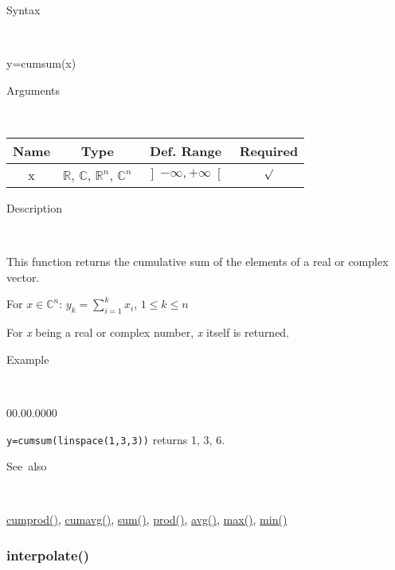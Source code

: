 \begin{description}
\item [Syntax]~
\end{description}
y=cumsum(x)

\begin{description}
\item [Arguments]~
\end{description}
\begin{tabular}{|c|c|c|c|}
\hline 
Name&
Type&
Def. Range&
Required\tabularnewline
\hline
\hline 
x&
$\mathbb{R}$, $\mathbb{C}$, $\mathbb{R}^{n}$, $\mathbb{C}^{n}$&
$\left]-\infty,+\infty\right[$&
$\surd$\tabularnewline
\hline
\end{tabular}

\begin{description}
\item [Description]~
\end{description}
This function returns the cumulative sum of the elements of a real
or complex vector.

\medskip{}
For $x\in$$\mathbb{C}^{n}$: $y_{k}=$${\displaystyle \sum\limits _{i=1}^{k}x_{i}}$,
$1\leq k\leq n$
\medskip{}

For \textit{x} being a real or complex number, \textit{x} itself is
returned.

\begin{description}
\item [Example]~
\end{description}
\begin{lyxlist}{00.00.0000}
\item [\texttt{y=cumsum(linspace(1,3,3))}]returns 1, 3, 6.
\end{lyxlist}
\begin{description}
\item [See~also]~
\end{description}
\textcolor{blue}{\hyperlink{cumprod}{cumprod()}}\textcolor{black}{,}
\textcolor{blue}{\hyperlink{cumavg}{cumavg()}}\textcolor{black}{,}
\textcolor{blue}{\hyperlink{sum}{sum()}}\textcolor{black}{,} \textcolor{blue}{\hyperlink{prod}{prod()}}\textcolor{black}{,}
\textcolor{blue}{\hyperlink{avg}{avg()}}\textcolor{black}{,} \textcolor{blue}{\hyperlink{max}{max()}}\textcolor{black}{,}
\textcolor{blue}{\hyperlink{min}{min()}}


\newpage
\subsubsection*{\hypertarget{interpolate}{}{\Large interpolate()}}


